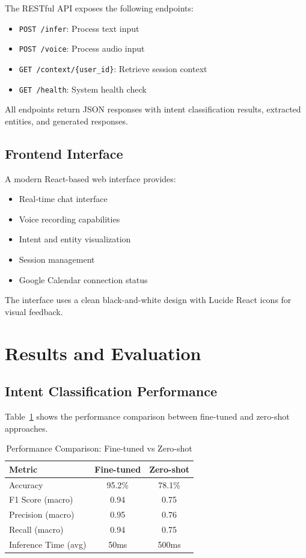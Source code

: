 \documentclass[conference]{IEEEtran}
\begin{document}
The RESTful API exposes the following endpoints:
\begin{itemize}
    \item \texttt{POST /infer}: Process text input
    \item \texttt{POST /voice}: Process audio input
    \item \texttt{GET /context/\{user\_id\}}: Retrieve session context
    \item \texttt{GET /health}: System health check
\end{itemize}

All endpoints return JSON responses with intent classification results, extracted entities, and generated responses.

\subsection{Frontend Interface}

A modern React-based web interface provides:
\begin{itemize}
    \item Real-time chat interface
    \item Voice recording capabilities
    \item Intent and entity visualization
    \item Session management
    \item Google Calendar connection status
\end{itemize}

The interface uses a clean black-and-white design with Lucide React icons for visual feedback.

\section{Results and Evaluation}

\subsection{Intent Classification Performance}

Table~\ref{tab:performance} shows the performance comparison between fine-tuned and zero-shot approaches.

\begin{table}[!t]
\centering
\caption{Performance Comparison: Fine-tuned vs Zero-shot}
\label{tab:performance}
\begin{tabular}{lcc}
\toprule
\textbf{Metric} & \textbf{Fine-tuned} & \textbf{Zero-shot} \\
\midrule
Accuracy & 95.2\% & 78.1\% \\
F1 Score (macro) & 0.94 & 0.75 \\
Precision (macro) & 0.95 & 0.76 \\
Recall (macro) & 0.94 & 0.75 \\
Inference Time (avg) & 50ms & 500ms \\
\bottomrule
\end{tabular}
\end{table}
\end{document}
